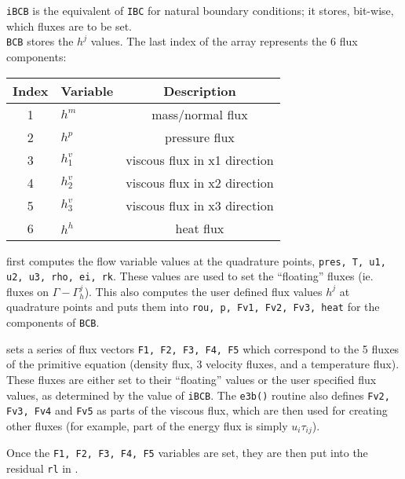 \documentclass[12pt, letterpaper, twoside]{article}
\newcommand{\ttt}[1]{\texttt{#1}}
\newcommand{\0}{\vec{0}}
\begin{document}
\ttt{iBCB} is the equivalent of \ttt{IBC} for natural boundary conditions; it stores, bit-wise, which fluxes are to be set. \\
\ttt{BCB} stores the \(h^j\) values. The last index of the array represents the 6 flux components:

\begin{tabular} { |c|l|c|}
    \hline
    Index & Variable & Description \\
    \hline
    1 & \(h^m\) & mass/normal flux \\
    2 & \(h^p\) & pressure flux \\
    3 & \(h^v_1\) & viscous flux in x1 direction\\
    4 & \(h^v_2\) & viscous flux in x2 direction\\
    5 & \(h^v_3\) & viscous flux in x3 direction\\
    6 & \(h^h\) & heat flux \\
    \hline

\end{tabular}

 first computes the flow variable values at the quadrature points, \ttt{pres, T, u1, u2, u3, rho, ei, rk}. These values are used to set the ``floating'' fluxes (ie. fluxes on \(\Gamma-\Gamma_h^j\)). This also computes the user defined flux values \(h^j\) at quadrature points and puts them into \ttt{rou, p, Fv1, Fv2, Fv3, heat} for the components of \ttt{BCB}. 

 sets a series of flux vectors \ttt{F1, F2, F3, F4, F5} which correspond to the 5 fluxes of the primitive equation (density flux, 3 velocity fluxes, and a temperature flux). These fluxes are either set to their ``floating'' values or the user specified flux values, as determined by the value of \ttt{iBCB}. The \ttt{e3b()} routine also defines \ttt{Fv2, Fv3, Fv4} and \ttt{Fv5} as parts of the viscous flux, which are then used for creating other fluxes (for example, part of the energy flux is simply \(u_i \tau_{ij}\)). 

Once the \ttt{F1, F2, F3, F4, F5} variables are set, they are then put into the residual \ttt{rl} in .
\end{document}
